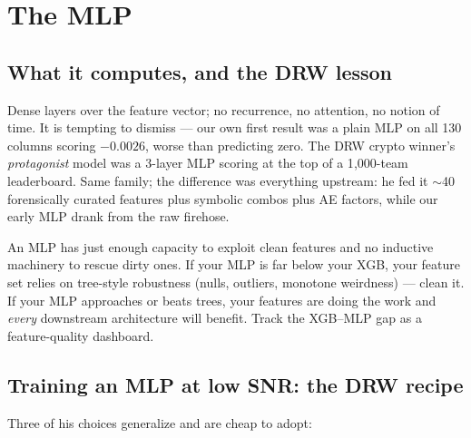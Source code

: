 \section{The MLP}

\subsection{What it computes, and the DRW lesson}

Dense layers over the feature vector; no recurrence, no attention, no
notion of time. It is tempting to dismiss --- our own first result was a
plain MLP on all 130 columns scoring $\bm{-0.0026}$, worse than predicting
zero. The DRW crypto winner's \emph{protagonist} model was a 3-layer MLP
scoring at the top of a 1{,}000-team leaderboard. Same family; the
difference was everything upstream: he fed it $\sim$40 forensically
curated features plus symbolic combos plus AE factors, while our early MLP
drank from the raw firehose.

\begin{keybox}
An MLP has just enough capacity to exploit clean features and no inductive
machinery to rescue dirty ones. If your MLP is far below your XGB, your
feature set relies on tree-style robustness (nulls, outliers, monotone
weirdness) --- clean it. If your MLP approaches or beats trees, your
features are doing the work and \emph{every} downstream architecture will
benefit. Track the XGB--MLP gap as a feature-quality dashboard.
\end{keybox}

\subsection{Training an MLP at low SNR: the DRW recipe}

Three of his choices generalize and are cheap to adopt:

